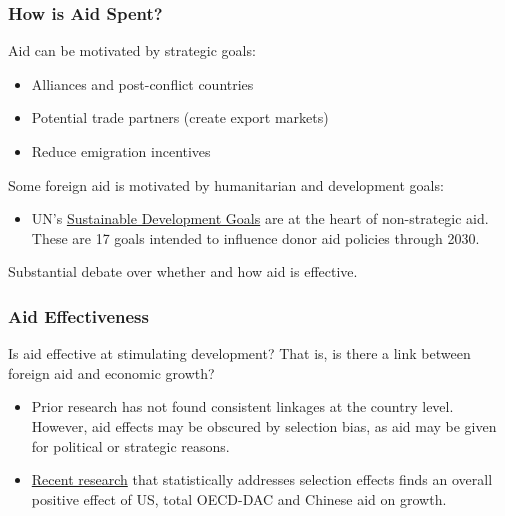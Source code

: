 \documentclass[handout]{beamer}
\begin{document}
\begin{frame} 
	\frametitle{\LARGE{How is Aid Spent?}}
	\begin{itemize}
		\large{
			\item Aid can be motivated by strategic goals: \pause 
			\begin{itemize}
			    \item Alliances and post-conflict countries \pause 
			    \item Potential trade partners (create export markets) \pause 
			    \item Reduce emigration incentives \pause 
			\end{itemize}
			\item Some foreign aid is motivated by humanitarian and development goals: \pause 
			\begin{itemize}
			    \item UN's \href{https://www.un.org/sustainabledevelopment/sustainable-development-goals/}{Sustainable Development Goals} are at the heart of non-strategic aid. These are 17 goals intended to influence donor aid policies through 2030. \pause 
			\end{itemize}
		\item Substantial debate over whether and how aid is effective.
		}
	\end{itemize}
\end{frame}

\begin{frame} 
	\frametitle{\LARGE{Aid Effectiveness}}
Is aid effective at stimulating development? That is, is there a link between foreign aid and economic growth? \pause
	\begin{itemize}

		\item Prior research has not found consistent linkages at the country level. However, aid effects may be obscured by selection bias, as aid may be given for political or strategic reasons. \pause
		\item \href{https://www.aiddata.org/publications/aid-china-and-growth-evidence-from-a-new-global-development-finance-dataset}{Recent research} that statistically addresses selection effects finds an overall positive effect of US, total OECD-DAC and Chinese aid on growth.
	\end{itemize}
\end{frame}
\end{document}
